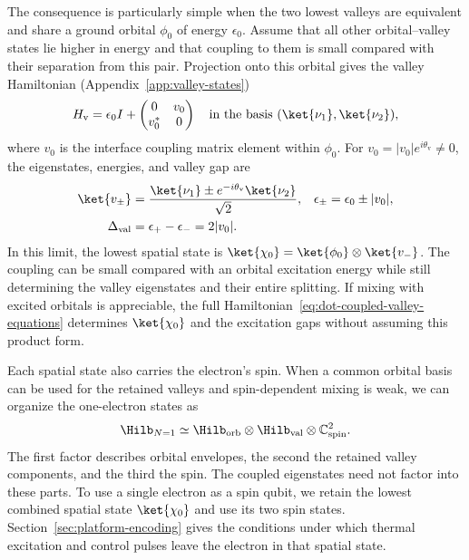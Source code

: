 The consequence is particularly simple when the two lowest valleys
are equivalent and share a ground orbital $\phi_0$ of energy
$\epsilon_0$. Assume that all other orbital--valley states lie
higher in energy and that coupling to them is small compared with
their separation from this pair. Projection onto this orbital gives the valley
Hamiltonian (Appendix~\ref{app:valley-states})
\begin{equation}
 H_{\mathrm v}=\epsilon_0 I+
   \begin{pmatrix}0&v_0\\v_0^*&0\end{pmatrix}
 \quad\text{in the basis }(\ket{\nu_1},\ket{\nu_2}),
 \label{eq:dot-valley-doublet}
\end{equation}
where $v_0$ is the interface coupling matrix element within
$\phi_0$. For $v_0=|v_0|e^{i\theta_{\mathrm v}}\ne0$, the
eigenstates, energies, and valley gap are
\begin{equation}
 \begin{aligned}
  \ket{v_\pm}
    &=\frac{\ket{\nu_1}\pm e^{-i\theta_{\mathrm v}}\ket{\nu_2}}
            {\sqrt2},
  &\epsilon_\pm&=\epsilon_0\pm|v_0|,\\
  \Delta_{\mathrm{val}}&=\epsilon_+-\epsilon_-=2|v_0|.
 \end{aligned}
 \label{eq:dot-valley-eigenstates}
\end{equation}
In this limit, the lowest spatial state is
$\ket{\chi_0}=\ket{\phi_0}\otimes\ket{v_-}$. The coupling
can be small compared with an orbital excitation energy while
still determining the valley eigenstates and their entire splitting.
If mixing with excited orbitals is appreciable, the full
Hamiltonian~\eqref{eq:dot-coupled-valley-equations} determines
$\ket{\chi_0}$ and the excitation gaps without assuming this
product form.

Each spatial state also carries the electron's spin. When a common
orbital basis can be used for the retained valleys and spin-dependent
mixing is weak, we can organize the one-electron states as
\begin{equation}
  \Hilb_{N=1}\simeq
  \Hilb_{\mathrm{orb}}\otimes
  \Hilb_{\mathrm{val}}\otimes
  \mathbb{C}^{2}_{\mathrm{spin}}.
  \label{eq:single-electron-space}
\end{equation}
The first factor describes orbital envelopes, the second the
retained valley components, and the third the spin. The coupled
eigenstates need not factor into these parts. To use a single
electron as a spin qubit, we retain the lowest combined spatial
state $\ket{\chi_0}$ and use its two spin states.
Section~\ref{sec:platform-encoding} gives the conditions under
which thermal excitation and control pulses leave the electron
in that spatial state.

